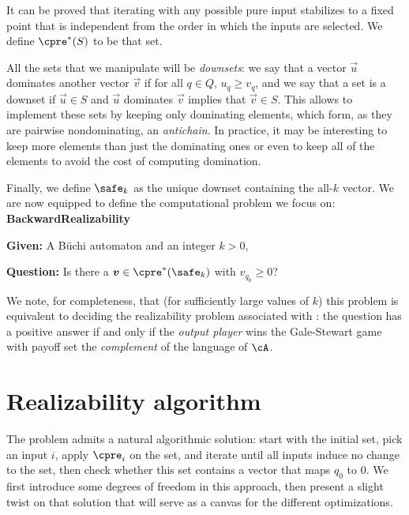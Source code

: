 \documentclass[runningheads,a4paper]{llncs}
\begin{document}
It can be proved that iterating \cpre with any possible pure input stabilizes to
a fixed point that is independent from the order in which the inputs are
selected.  We define \(\cpre^*(S)\) to be that set.

All the sets that we manipulate will be \emph{downsets}: we say that a vector
\(\vec{u}\) dominates another vector \(\vec{v}\) if for all \(q \in Q\),
\(u_q \geq v_q\), and we say that a set is a downset if \(\vec{u} \in S\) and
\(\vec{u}\) dominates \(\vec{v}\) implies that \(\vec{v} \in S\).  This allows to
implement these sets by keeping only dominating elements, which form, as they
are pairwise nondominating, an \emph{antichain}.  In practice, it may be
interesting to keep more elements than just the dominating ones or even to keep
all of the elements to avoid the cost of computing domination.

Finally, we define \(\safe_k\) as the unique downset containing the all-\(k\)
vector.
We are now equipped to define the computational problem we focus on:\\[1em]
\textbf{BackwardRealizability}
\begin{compactitem}
\item \textbf{Given:} A Büchi automaton \cA and an integer \(k > 0\),
\item \textbf{Question:} Is there a \(\vec{v} \in \cpre^*(\safe_k)\) with \(v_{q_0} \geq
  0\)?
\end{compactitem}
\vspace{1em}

We note, for completeness, that (for sufficiently large values of $k$) this
problem is equivalent to deciding the realizability problem associated with
\cA: the question has a positive answer if and only if the \emph{output player} wins the
Gale-Stewart game with payoff set the \emph{complement} of the language of \(\cA\).

\section{Realizability algorithm}

The problem admits a natural algorithmic solution: start with the initial set,
pick an input \(i\), apply \(\cpre_i\) on the set, and iterate until all
inputs induce no change to the set, then check whether this set contains a
vector that maps \(q_0\) to \(0\).  We first introduce some degrees of freedom
in this approach, then present a slight twist on that solution that will serve
as a canvas for the different optimizations.
\end{document}
